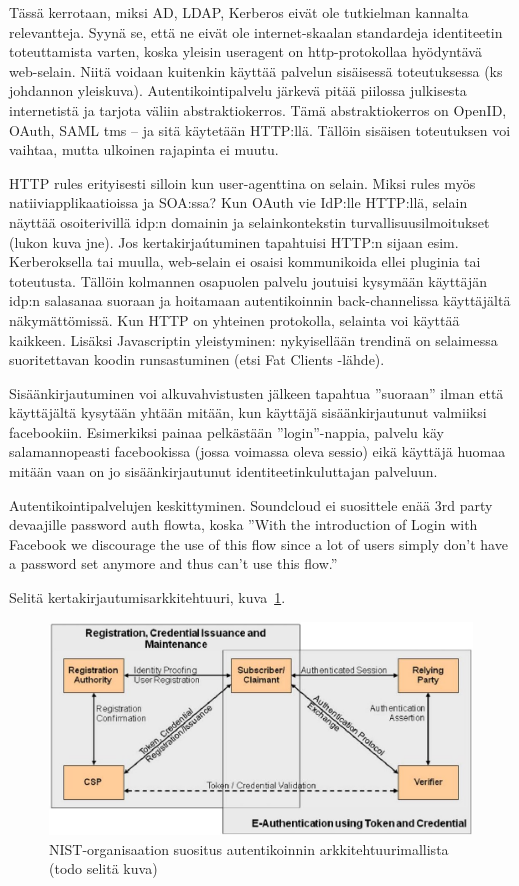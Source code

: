 \documentclass[finnish,gradu]{tktltiki}
\begin{document}
  Tässä kerrotaan, miksi AD, LDAP, Kerberos eivät ole tutkielman kannalta relevantteja. Syynä se, että ne eivät ole internet-skaalan standardeja identiteetin toteuttamista varten, koska yleisin useragent on http-protokollaa hyödyntävä web-selain. Niitä voidaan kuitenkin käyttää palvelun sisäisessä toteutuksessa (ks johdannon yleiskuva). Autentikointipalvelu järkevä pitää piilossa julkisesta internetistä ja tarjota väliin abstraktiokerros. Tämä abstraktiokerros on OpenID, OAuth, SAML tms -- ja sitä käytetään HTTP:llä. Tällöin sisäisen toteutuksen voi vaihtaa, mutta ulkoinen rajapinta ei muutu.

  HTTP rules erityisesti silloin kun user-agenttina on selain. Miksi rules myös natiiviapplikaatioissa ja SOA:ssa?
  Kun OAuth vie IdP:lle HTTP:llä, selain näyttää osoiterivillä idp:n domainin ja selainkontekstin turvallisuusilmoitukset (lukon kuva jne). Jos kertakirjaútuminen tapahtuisi HTTP:n sijaan esim. Kerberoksella tai muulla, web-selain ei osaisi kommunikoida ellei pluginia tai toteutusta. Tällöin kolmannen osapuolen palvelu joutuisi kysymään käyttäjän idp:n salasanaa suoraan ja hoitamaan autentikoinnin back-channelissa käyttäjältä näkymättömissä.
  Kun HTTP on yhteinen protokolla, selainta voi käyttää kaikkeen. Lisäksi Javascriptin yleistyminen: nykyisellään trendinä on selaimessa suoritettavan koodin runsastuminen (etsi Fat Clients -lähde).

  Sisäänkirjautuminen voi alkuvahvistusten jälkeen tapahtua ''suoraan'' ilman että käyttäjältä kysytään yhtään mitään, kun käyttäjä sisäänkirjautunut valmiiksi facebookiin. Esimerkiksi painaa pelkästään ''login''-nappia, palvelu käy salamannopeasti facebookissa (jossa voimassa oleva sessio) eikä käyttäjä huomaa mitään vaan on jo sisäänkirjautunut identiteetinkuluttajan palveluun.

  Autentikointipalvelujen keskittyminen. Soundcloud ei suosittele enää 3rd party devaajille password auth flowta, koska ''With the introduction of Login with Facebook we discourage the use of this flow since a lot of users simply don't have a password set anymore and thus can't use this flow.''


  Selitä kertakirjautumisarkkitehtuuri, kuva~\ref{fig:kertakirjautumisarkkitehtuurin_yleiskuva}.
  \begin{figure}
    \centering
    \includegraphics[width=1.0\textwidth]{images/NIST_authentication_architectural_model.jpg}
    \caption{NIST-organisaation suositus autentikoinnin arkkitehtuurimallista~\cite{NIST_SP800-63-1} (todo selitä kuva) }
    \label{fig:kertakirjautumisarkkitehtuurin_yleiskuva}
  \end{figure}
\end{document}
